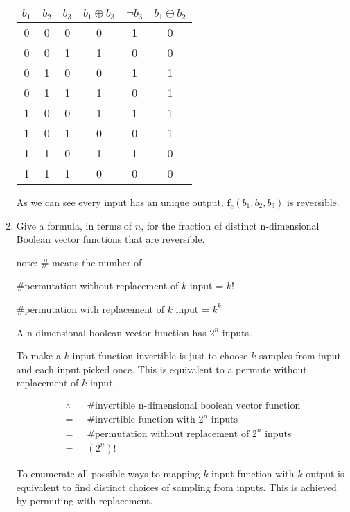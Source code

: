 \documentclass[11pt]{article}
\begin{document}
\begin{enumerate}[label=\alph*.]
    \begin{tabular}{ccc|ccc}
         $b_1$ & $b_2$ & $b_3$ & $b_1 \oplus b_3$ & $\neg b_3$ & $b_1 \oplus b_2$ \\ \hline \hline
         0 & 0 & 0 & 0 & 1 & 0 \\
         0 & 0 & 1 & 1 & 0 & 0 \\
         0 & 1 & 0 & 0 & 1 & 1 \\
         0 & 1 & 1 & 1 & 0 & 1 \\
         1 & 0 & 0 & 1 & 1 & 1 \\
         1 & 0 & 1 & 0 & 0 & 1 \\
         1 & 1 & 0 & 1 & 1 & 0 \\
         1 & 1 & 1 & 0 & 0 & 0 \\
    \end{tabular}
    
    As we can see every input has an unique output, $\mathbf{f}_c(b_1, b_2, b_3)$ is reversible.
    
    \item Give a formula, in terms of $n$, for the fraction of distinct n-dimensional Boolean vector functions that are reversible.
    
    note: \# means the number of
    
    \#permutation without replacement of $k$ input = $k!$
    
    \#permutation with replacement of $k$ input = $k^k$
    
    A n-dimensional boolean vector function has $2^n$ inputs.
    
    \bigbreak
    
    To make a $k$ input function invertible is just to choose $k$ samples from input and each input picked once. This is equivalent to a permute without replacement of $k$ input.
    
    \begin{align*}
        \therefore\ \ \ \ & \# \text{invertible n-dimensional boolean vector function} \\
        = & \# \text{invertible function with } 2^n \text{ inputs} \\
        = & \# \text{permutation without replacement of } 2^n \text{ inputs} \\
        = & (2^n)!
    \end{align*}
    
    To enumerate all possible ways to mapping $k$ input function with $k$ output is equivalent to find distinct choices of sampling from inputs. This is achieved by permuting with replacement.
    

\end{enumerate}
\end{document}

